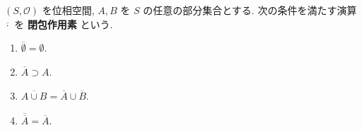 \begin{framed}
    \begin{dfn}[]\label{dfn::closure-op}
        $(S,\mathcal{O})$ を位相空間, $A,B$ を $S$ の任意の部分集合とする. 次の条件を満たす演算 $\overline{\cdot}$ を \textbf{閉包作用素} という.

        \begin{enumerate}
            \item $\overline{\emptyset}=\emptyset.$
            \item $\overline{A}\supset A.$
            \item $\overline{A\cup B}=\overline{A}\cup\overline{B}.$
            \item $\overline{\overline{A}}=\overline{A}.$
        \end{enumerate}
    \end{dfn}
\end{framed}